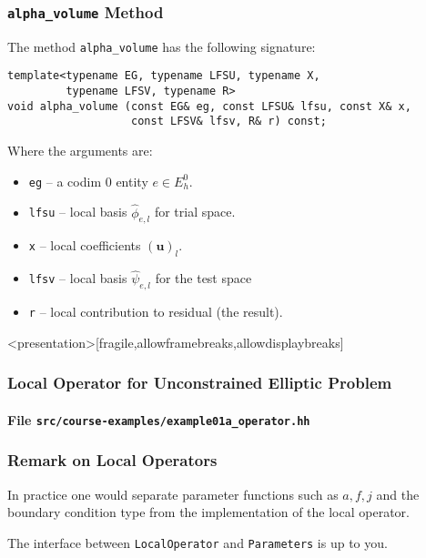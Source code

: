 \begin{frame}[fragile]
\frametitle{\lstinline{alpha_volume} Method}
The method \lstinline{alpha_volume} has the following signature:
\begin{lstlisting}[basicstyle=\scriptsize]
template<typename EG, typename LFSU, typename X,
         typename LFSV, typename R>
void alpha_volume (const EG& eg, const LFSU& lfsu, const X& x,
                   const LFSV& lfsv, R& r) const;
\end{lstlisting}
Where the arguments are:
\begin{itemize}
\item \lstinline{eg} -- a codim 0 entity $e\in E_h^0$.
\item \lstinline{lfsu} -- local basis $\hat\phi_{e,l}$ for trial space.
\item \lstinline{x} -- local coefficients $(\mathbf{u})_l$.
\item \lstinline{lfsv} -- local basis $\hat\psi_{e,l}$ for the test space
\item \lstinline{r} -- local contribution to residual (the result).
\end{itemize}
\end{frame}


\begin{frame}<presentation>[fragile,allowframebreaks,allowdisplaybreaks]
\frametitle<presentation>{Local Operator for Unconstrained Elliptic Problem}
\framesubtitle<presentation>{File \texttt{src/course-examples/example01a\_operator.hh}}

\end{frame}

\begin{frame}
\frametitle{Remark on Local Operators}
In practice one would separate parameter functions such as $a, f, j$ and the boundary condition
type from the implementation of the local operator.

\begin{center}
\end{center}
The interface between \lstinline{LocalOperator} and \lstinline{Parameters} is up to you.
\end{frame}


